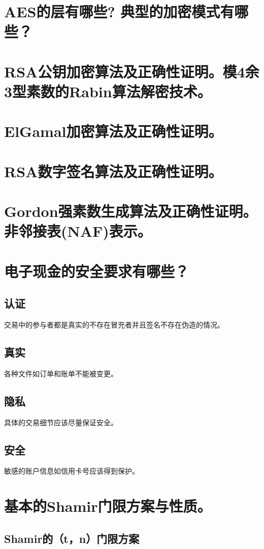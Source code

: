 \documentclass[11pt,a4paper]{article}
\begin{document}
\section{AES的层有哪些? 典型的加密模式有哪些？}

\section{RSA公钥加密算法及正确性证明。模4余3型素数的Rabin算法解密技术。}

\section{ElGamal加密算法及正确性证明。}

\section{RSA数字签名算法及正确性证明。}

\section{Gordon强素数生成算法及正确性证明。非邻接表(NAF)表示。}

\section{电子现金的安全要求有哪些？}
\subsection{认证}交易中的参与者都是真实的不存在冒充者并且签名不存在伪造的情况。
\subsection{真实}各种文件如订单和账单不能被变更。
\subsection{隐私}具体的交易细节应该尽量保证安全。
\subsection{安全}敏感的账户信息如信用卡号应该得到保护。
\section{基本的Shamir门限方案与性质。}

\subsection{Shamir的（t，n）门限方案}
\end{document}
